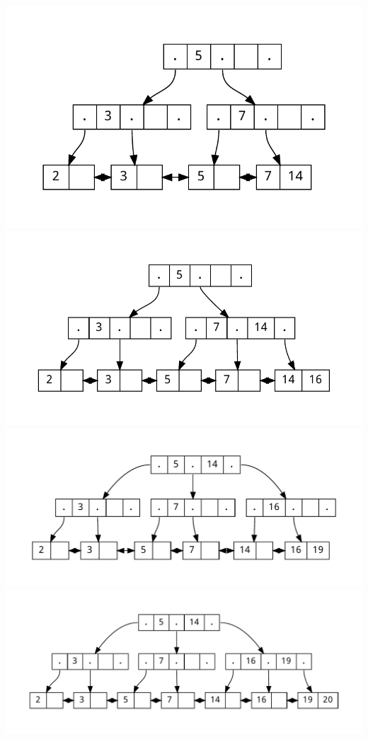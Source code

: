 \documentclass{uni_tue_template}
\begin{document}
  \includegraphics[scale=0.4]{./dot/A1_1-05.pdf}\\
  \includegraphics[scale=0.4]{./dot/A1_1-06.pdf}\\
  \includegraphics[scale=0.4]{./dot/A1_1-07.pdf}\\
  \includegraphics[scale=0.4]{./dot/A1_1-08.pdf}\\
\end{document}
